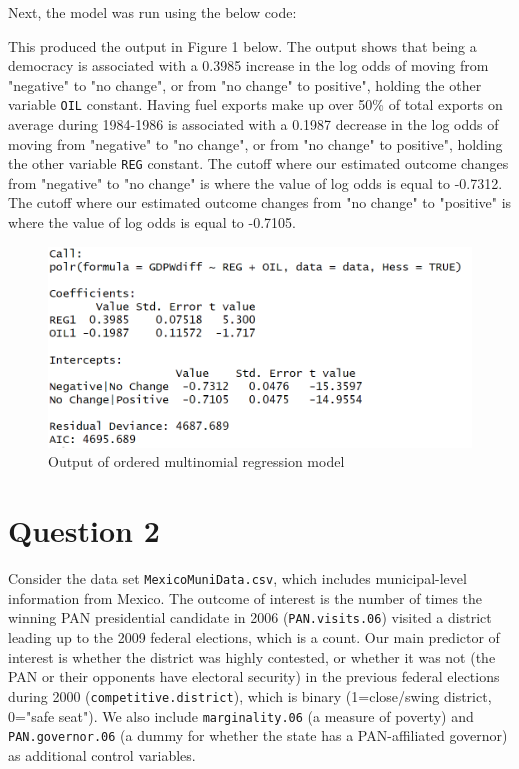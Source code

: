 \documentclass[12pt,letterpaper]{article}
\begin{document}
\begin{enumerate}
	\vspace{.5cm}
	  
	\vspace{.5cm} 
	
	Next, the model was run using the below code:
	
	\vspace{.5cm}
	  
	\vspace{.5cm} 

	This produced the output in Figure 1 below. The output shows that being a democracy is associated with a 0.3985 increase in the log odds of moving from "negative" to "no change", or from "no change" to positive", holding the other variable \texttt{OIL} constant. Having fuel exports make up over 50\% of total exports on average during 1984-1986 is associated with a 0.1987 decrease in the log odds of moving from "negative" to "no change", or from "no change" to positive", holding the other variable \texttt{REG} constant. The cutoff where our estimated outcome changes from "negative" to "no change" is where the value of log odds is equal to -0.7312. The cutoff where our estimated outcome changes from "no change" to "positive" is where the value of log odds is equal to -0.7105.
	
		\begin{figure}[H]\centering
		\caption{\footnotesize Output of ordered multinomial regression model}
		\includegraphics[width=.75\textwidth]{orderedMultinomOutput.png}
		\end{figure} 
	
\end{enumerate}

\section*{Question 2} 
\vspace{.25cm}

\noindent Consider the data set \texttt{MexicoMuniData.csv}, which includes municipal-level information from Mexico. The outcome of interest is the number of times the winning PAN presidential candidate in 2006 (\texttt{PAN.visits.06}) visited a district leading up to the 2009 federal elections, which is a count. Our main predictor of interest is whether the district was highly contested, or whether it was not (the PAN or their opponents have electoral security) in the previous federal elections during 2000 (\texttt{competitive.district}), which is binary (1=close/swing district, 0="safe seat"). We also include \texttt{marginality.06} (a measure of poverty) and \texttt{PAN.governor.06} (a dummy for whether the state has a PAN-affiliated governor) as additional control variables. 
\end{document}
